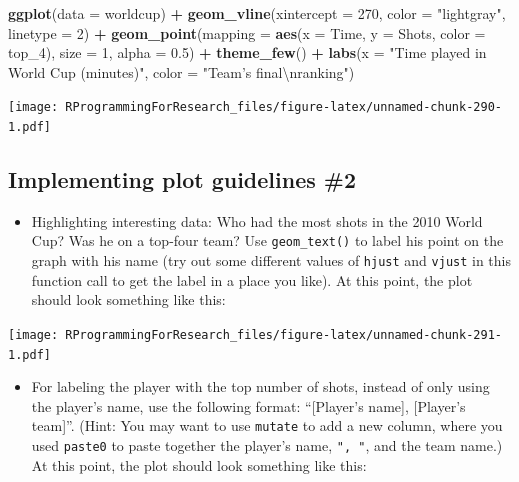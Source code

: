 \documentclass[]{book}
\makeatletter
\newenvironment{Shaded}{\begin{snugshade}}{\end{snugshade}}
\newcommand{\KeywordTok}[1]{\textcolor[rgb]{0.13,0.29,0.53}{\textbf{#1}}}
\newcommand{\DataTypeTok}[1]{\textcolor[rgb]{0.13,0.29,0.53}{#1}}
\newcommand{\DecValTok}[1]{\textcolor[rgb]{0.00,0.00,0.81}{#1}}
\newcommand{\FloatTok}[1]{\textcolor[rgb]{0.00,0.00,0.81}{#1}}
\newcommand{\CharTok}[1]{\textcolor[rgb]{0.31,0.60,0.02}{#1}}
\newcommand{\StringTok}[1]{\textcolor[rgb]{0.31,0.60,0.02}{#1}}
\newcommand{\OperatorTok}[1]{\textcolor[rgb]{0.81,0.36,0.00}{\textbf{#1}}}
\newcommand{\NormalTok}[1]{#1}
\providecommand{\tightlist}{%
  \setlength{\itemsep}{0pt}\setlength{\parskip}{0pt}}
\newenvironment{kframe}{%
\medskip{}
\setlength{\fboxsep}{.8em}
 \def\at@end@of@kframe{}%
 \ifinner\ifhmode%
  \def\at@end@of@kframe{\end{minipage}}%
  \begin{minipage}{\columnwidth}%
 \fi\fi%
 \def\FrameCommand##1{\hskip\@totalleftmargin \hskip-\fboxsep
 \colorbox{shadecolor}{##1}\hskip-\fboxsep
     \hskip-\linewidth \hskip-\@totalleftmargin \hskip\columnwidth}%
 \MakeFramed {\advance\hsize-\width
   \@totalleftmargin\z@ \linewidth\hsize
   \@setminipage}}%
 {\par\unskip\endMakeFramed%
 \at@end@of@kframe}
\renewenvironment{Shaded}{\begin{kframe}}{\end{kframe}}
\theoremstyle{definition}
\theoremstyle{definition}
\theoremstyle{definition}
\theoremstyle{remark}
\makeatother
\begin{document}
\begin{Shaded}
\begin{Highlighting}[]
\KeywordTok{ggplot}\NormalTok{(}\DataTypeTok{data =}\NormalTok{ worldcup) }\OperatorTok{+}
\StringTok{  }\KeywordTok{geom_vline}\NormalTok{(}\DataTypeTok{xintercept =} \DecValTok{270}\NormalTok{, }\DataTypeTok{color =} \StringTok{"lightgray"}\NormalTok{, }\DataTypeTok{linetype =} \DecValTok{2}\NormalTok{) }\OperatorTok{+}
\StringTok{  }\KeywordTok{geom_point}\NormalTok{(}\DataTypeTok{mapping =} \KeywordTok{aes}\NormalTok{(}\DataTypeTok{x =}\NormalTok{ Time, }\DataTypeTok{y =}\NormalTok{ Shots, }\DataTypeTok{color =}\NormalTok{ top_}\DecValTok{4}\NormalTok{),}
             \DataTypeTok{size =} \DecValTok{1}\NormalTok{, }\DataTypeTok{alpha =} \FloatTok{0.5}\NormalTok{) }\OperatorTok{+}\StringTok{ }
\StringTok{  }\KeywordTok{theme_few}\NormalTok{() }\OperatorTok{+}\StringTok{ }
\StringTok{  }\KeywordTok{labs}\NormalTok{(}\DataTypeTok{x =} \StringTok{"Time played in World Cup (minutes)"}\NormalTok{,}
       \DataTypeTok{color =} \StringTok{"Team's final}\CharTok{\textbackslash{}n}\StringTok{ranking"}\NormalTok{)}
\end{Highlighting}
\end{Shaded}

\texttt{[image: RProgrammingForResearch\_files/figure-latex/unnamed-chunk-290-1.pdf]}

\subsection{Implementing plot guidelines
\#2}\label{implementing-plot-guidelines-2}

\begin{itemize}
\tightlist
\item
  Highlighting interesting data: Who had the most shots in the 2010
  World Cup? Was he on a top-four team? Use \texttt{geom\_text()} to
  label his point on the graph with his name (try out some different
  values of \texttt{hjust} and \texttt{vjust} in this function call to
  get the label in a place you like). At this point, the plot should
  look something like this:
\end{itemize}

\texttt{[image: RProgrammingForResearch\_files/figure-latex/unnamed-chunk-291-1.pdf]}

\begin{itemize}
\tightlist
\item
  For labeling the player with the top number of shots, instead of only
  using the player's name, use the following format: ``{[}Player's
  name{]}, {[}Player's team{]}''. (Hint: You may want to use
  \texttt{mutate} to add a new column, where you used \texttt{paste0} to
  paste together the player's name, \texttt{",\ "}, and the team name.)
  At this point, the plot should look something like this:
\end{itemize}
\end{document}
